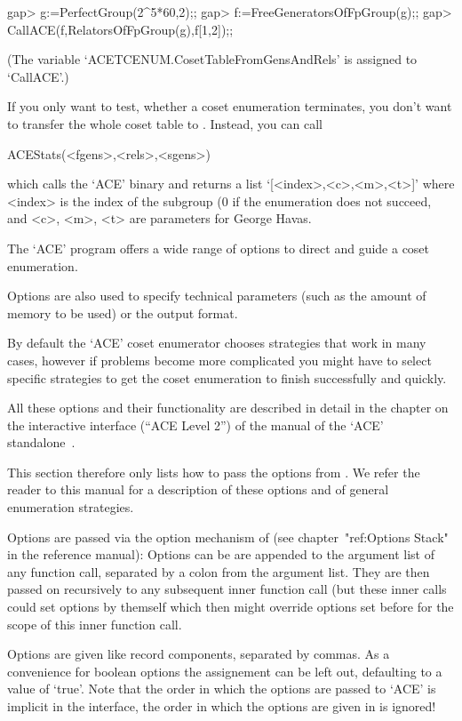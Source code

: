\begintt
gap> g:=PerfectGroup(2^5*60,2);;
gap> f:=FreeGeneratorsOfFpGroup(g);;
gap> CallACE(f,RelatorsOfFpGroup(g),f{[1,2]});;
\endtt

(The variable `ACETCENUM.CosetTableFromGensAndRels' is assigned to
`CallACE'.)

If you only want to test, whether a coset enumeration terminates, you don't
want to transfer the whole coset table to {\GAP}. Instead, you can call

\>ACEStats(<fgens>,<rels>,<sgens>)

which calls the `ACE' binary and returns a list `[<index>,<c>,<m>,<t>]'
where <index> is the index of the subgroup (0 if the enumeration does not
succeed, and <c>, <m>, <t> are parameters for George Havas.


The `ACE' program offers a wide range of options to direct and guide a
coset enumeration.

Options are also used to specify technical parameters (such as the amount of
memory to be used) or the output format.

By default the `ACE' coset enumerator chooses strategies that work in many 
cases, however if problems become more complicated you might have to select
specific strategies to get the coset enumeration to finish successfully and
quickly.

All these options and their functionality are described in detail in the
chapter on the interactive interface (``ACE Level 2'') of the manual of the
`ACE' standalone~\cite{aceman}. 

This section therefore only lists how to pass the options from {\GAP}.
We refer the reader to this manual for a
description of these options and of general enumeration strategies.

Options are passed via the option mechanism of {\GAP} (see
chapter~"ref:Options Stack" in the reference manual):
Options can be are appended to the argument list of any function call,
separated by a colon from the argument list. They are then passed on
recursively to any subsequent inner function call (but these inner calls
could set options by themself which then might override options set before
for the scope of this inner function call.

Options are given like record components, separated by commas. As a
convenience for boolean options the assignement can be left out, defaulting
to a value of `true'. Note that the order in which the options are passed to
`ACE' is implicit in the interface, the order in which the options are given
in {\GAP} is ignored!

